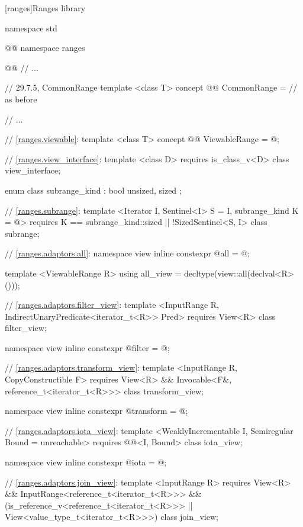 
\setcounter{chapter}{28}
[ranges]{Ranges library}


\begin{codeblock}
namespace std { @@ namespace ranges { @@
  // ...

  // 29.7.5, CommonRange
  template <class T>
  concept @@ CommonRange = // as before

  // ...

  // \ref{ranges.viewable}:
  template <class T>
  concept @@ ViewableRange = @\seebelow@;

  // \ref{ranges.view_interface}:
  template <class D>
    requires is_class_v<D>
  class view_interface;

  enum class subrange_kind : bool { unsized, sized };

  // \ref{ranges.subrange}:
  template <Iterator I, Sentinel<I> S = I, subrange_kind K = @\seebelow@>
    requires K == subrange_kind::sized || !SizedSentinel<S, I>
  class subrange;

  // \ref{ranges.adaptors.all}:
  namespace view { inline constexpr @\unspec@ all = @\unspec@; }

  template <ViewableRange R>
  using all_view = decltype(view::all(declval<R>()));

  // \ref{ranges.adaptors.filter_view}:
  template <InputRange R, IndirectUnaryPredicate<iterator_t<R>> Pred>
    requires View<R>
  class filter_view;

  namespace view { inline constexpr @\unspec@ filter = @\unspec@; }

  // \ref{ranges.adaptors.transform_view}:
  template <InputRange R, CopyConstructible F>
    requires View<R> && Invocable<F&, reference_t<iterator_t<R>>>
  class transform_view;

  namespace view { inline constexpr @\unspec@ transform = @\unspec@; }

  // \ref{ranges.adaptors.iota_view}:
  template <WeaklyIncrementable I, Semiregular Bound = unreachable>
    requires @@<I, Bound>
  class iota_view;

  namespace view { inline constexpr @\unspec@ iota = @\unspec@; }

  // \ref{ranges.adaptors.join_view}:
  template <InputRange R>
    requires View<R> && InputRange<reference_t<iterator_t<R>>> &&
      (is_reference_v<reference_t<iterator_t<R>>> ||
        View<value_type_t<iterator_t<R>>>)
  class join_view;

}}
\end{codeblock}
